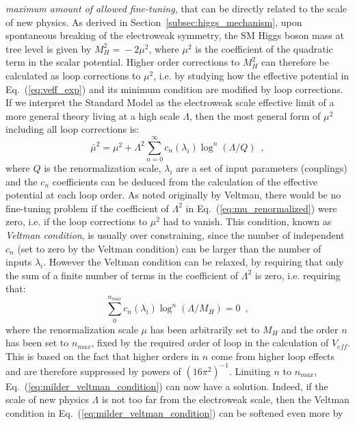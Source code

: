 \documentclass[12pt,prd,onecolumn,aps,floats,superscriptaddress,floatfix,nofootinbib]{revtex4-2}
\begin{document}
\emph{maximum amount of allowed fine-tuning}, that can be directly
related to the scale of new physics. As derived in
Section~\ref{subsec:higgs_mechanism}, upon spontaneous breaking of the
electroweak symmetry, the SM Higgs boson mass at tree level is given
by $M_H^2\!=\!-2\mu^2$, where $\mu^2$ is the coefficient of the
quadratic term in the scalar potential. Higher order corrections to
$M_H^2$ can therefore be calculated as loop corrections to $\mu^2$,
i.e. by studying how the effective potential in
Eq.~(\ref{eq:veff_exp}) and its minimum condition are modified by loop
corrections.  If we interpret the Standard Model as the electroweak
scale effective limit of a more general theory living at a high scale
$\Lambda$, then the most general form of $\mu^2$ including all loop
corrections is:
\begin{equation}
\label{eq:mu_renormalized}
\bar\mu^2=\mu^2+\Lambda^2\sum_{n=0}^{\infty}c_n(\lambda_i)\log^n(\Lambda/Q)
\,\,\,,
\end{equation}
where $Q$ is the renormalization scale, $\lambda_i$ are a set of input
parameters (couplings) and the $c_n$ coefficients can be deduced from
the calculation of the effective potential at each loop order. As
noted originally by Veltman, there would be no fine-tuning problem if
the coefficient of $\Lambda^2$ in Eq.~(\ref{eq:mu_renormalized}) were
zero, i.e. if the loop corrections to $\mu^2$ had to vanish. This
condition, known as \emph{Veltman condition}, is usually over constraining,
since the number of independent $c_n$ (set to zero by the Veltman
condition) can be larger than the number of inputs
$\lambda_i$. However the Veltman condition can be relaxed, by
requiring that only the sum of a finite number of terms in the
coefficient of $\Lambda^2$ is zero, i.e. requiring that:
\begin{equation}
\label{eq:milder_veltman_condition}
\sum_0^{n_{max}}c_n(\lambda_i)\log^n(\Lambda/M_H)=0\,\,\,,
\end{equation}
where the renormalization scale $\mu$ has been arbitrarily set to
$M_H$ and the order $n$ has been set to $n_{max}$, fixed by the
required order of loop in the calculation of $V_{eff}$. This is based
on the fact that higher orders in $n$ come from higher loop effects
and are therefore suppressed by powers of $(16\pi^2)^{-1}$. Limiting
$n$ to $n_{max}$, Eq.~(\ref{eq:milder_veltman_condition}) can now have
a solution. Indeed, if the scale of new physics $\Lambda$ is not too
far from the electroweak scale, then the Veltman condition in
Eq.~(\ref{eq:milder_veltman_condition}) can be softened even more by
\end{document}
